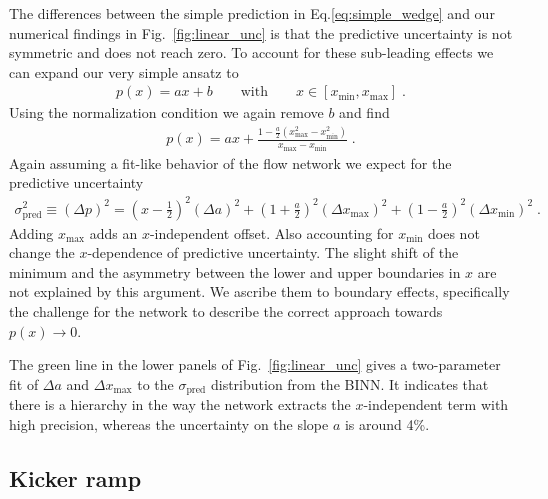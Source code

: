 The differences between the simple prediction in
Eq.\eqref{eq:simple_wedge} and our numerical findings in
Fig.~\ref{fig:linear_unc} is that the predictive uncertainty is not
symmetric and does not reach zero. To account for these sub-leading
effects we can expand our very simple ansatz to
%
\begin{align}
  p(x) = a  x + b
  \qquad \text{with} \qquad x \in [x_\text{min},x_\text{max}] \; .
\label{eq:fund_wedge}
\end{align}
%
Using the normalization condition we again remove $b$ and find
%
\begin{align}
  p(x)
  = a x
  +  \frac{ 1 - \frac{a}{2}(x_\text{max}^2 - x_\text{min}^2) }{ x_\text{max} - x_\text{min} } \; .
\end{align}
%
Again assuming a fit-like behavior of the flow network we expect for
the predictive uncertainty
%
\begin{align}
\sigma_\text{pred}^2 \equiv (\Delta p)^2 =
    \left( x - \frac{1}{2} \right)^2 (\Delta a)^2
    + \left(1 + \frac{a}{2} \right)^2 (\Delta x_\text{max} )^2
    + \left(1 - \frac{a}{2} \right)^2 (\Delta x_\text{min} )^2 \; .
\label{eq:fit_wedge}
\end{align}
%
Adding $x_\text{max}$ adds an $x$-independent offset. Also accounting
for $x_\text{min}$ does not change the $x$-dependence of predictive
uncertainty. The slight shift of the minimum and the asymmetry between
the lower and upper boundaries in $x$ are not explained by this
argument.  We ascribe them to boundary effects, specifically the
challenge for the network to describe the correct approach towards
$p(x) \to 0$.

The green line in the lower panels of Fig.~\ref{fig:linear_unc} gives
a two-parameter fit of $\Delta a$ and $\Delta x_\text{max}$ to the
$\sigma_\text{pred}$ distribution from the BINN. It indicates that
there is a hierarchy in the way the network extracts the
$x$-independent term with high precision, whereas the uncertainty on
the slope $a$ is around 4\%.

\subsection{Kicker ramp}
\label{sec:toy_kicker}

